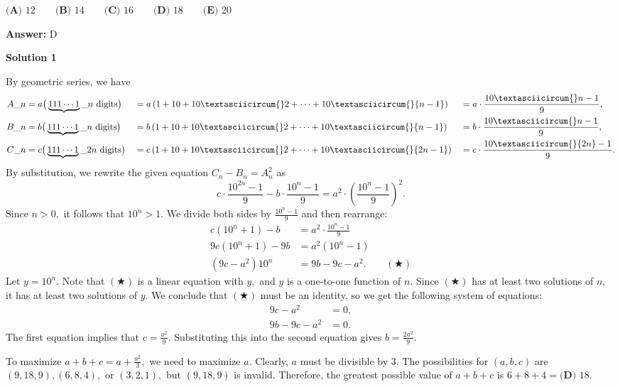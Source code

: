 \begin{enumerate}
 $\textbf{(A) } 12 \qquad \textbf{(B) } 14 \qquad \textbf{(C) } 16 \qquad \textbf{(D) } 18 \qquad \textbf{(E) } 20$

 \textbf{Answer: }D



\textbf{Solution 1}

By geometric series, we have
 \begin{alignat*}{8} A\_n&=a\bigl(\phantom{ }\underbrace{111\cdots1}\_{n\text{ digits}}\phantom{ }\bigr)&&=a\left(1+10+10\textasciicircum{}2+\cdots+10\textasciicircum{}{n-1}\right)&&=a\cdot\frac{10\textasciicircum{}n-1}{9}, \\ B\_n&=b\bigl(\phantom{ }\underbrace{111\cdots1}\_{n\text{ digits}}\phantom{ }\bigr)&&=b\left(1+10+10\textasciicircum{}2+\cdots+10\textasciicircum{}{n-1}\right)&&=b\cdot\frac{10\textasciicircum{}n-1}{9}, \\ C\_n&=c\bigl(\phantom{ }\underbrace{111\cdots1}\_{2n\text{ digits}}\phantom{ }\bigr)&&=c\left(1+10+10\textasciicircum{}2+\cdots+10\textasciicircum{}{2n-1}\right)&&=c\cdot\frac{10\textasciicircum{}{2n}-1}{9}. \end{alignat*}By substitution, we rewrite the given equation $C_n - B_n = A_n^2$ as
 \[c\cdot\frac{10^{2n}-1}{9} - b\cdot\frac{10^n-1}{9} = a^2\cdot\left(\frac{10^n-1}{9}\right)^2.\]Since $n > 0,$ it follows that $10^n > 1.$ We divide both sides by $\frac{10^n-1}{9}$ and then rearrange:
 \begin{align*} c\left(10^n+1\right) - b &= a^2\cdot\frac{10^n-1}{9} \\ 9c\left(10^n+1\right) - 9b &= a^2\left(10^n-1\right) \\ \left(9c-a^2\right)10^n &= 9b-9c-a^2. &&(\bigstar) \end{align*}
Let $y=10^n.$ Note that $(\bigstar)$ is a linear equation with $y,$ and $y$ is a one-to-one function of $n.$ Since $(\bigstar)$ has at least two solutions of $n,$ it has at least two solutions of $y.$ We conclude that $(\bigstar)$ must be an identity, so we get the following system of equations:
 \begin{align*} 9c-a^2&=0, \\ 9b-9c-a^2&=0. \end{align*}
The first equation implies that $c=\frac{a^2}{9}.$ Substituting this into the second equation gives $b=\frac{2a^2}{9}.$ 

 To maximize $a + b + c = a + \frac{a^2}{3},$ we need to maximize $a.$ Clearly, $a$ must be divisible by $3.$ The possibilities for $(a,b,c)$ are $(9,18,9),(6,8,4),$ or $(3,2,1),$ but $(9,18,9)$ is invalid. Therefore, the greatest possible value of $a + b + c$ is $6+8+4=\boxed{\textbf{(D) } 18}.$





\end{enumerate}
